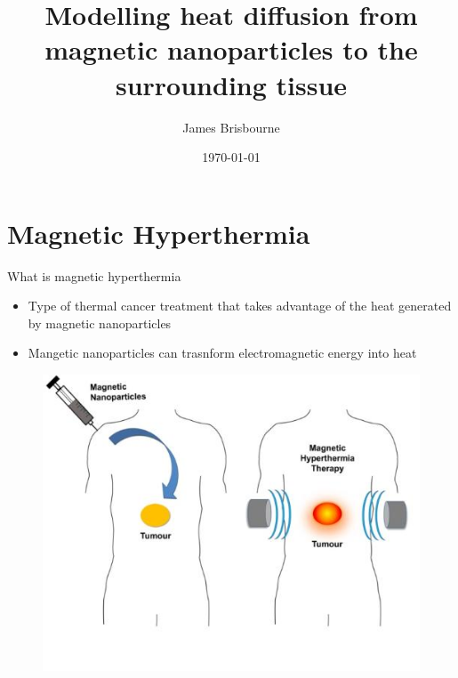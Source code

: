 \documentclass{beamer}
\title{Modelling heat diffusion from magnetic nanoparticles to the surrounding tissue}
\date{\today}
\author{James Brisbourne}
\institute{University of York}
\begin{document}
  \maketitle
  
  
  \section{Magnetic Hyperthermia}
  
  
  
  
  \begin{frame}{What is magnetic hyperthermia}
  \begin{itemize}
  \item Type of thermal cancer treatment that takes advantage of the heat generated by magnetic nanoparticles
  \item Mangetic nanoparticles can trasnform electromagnetic energy into heat
  \end{itemize}
  
	\begin{figure}
	\includegraphics[scale=0.4]{injection.jpg}
\end{figure}	  
  
  \end{frame}
\end{document}
